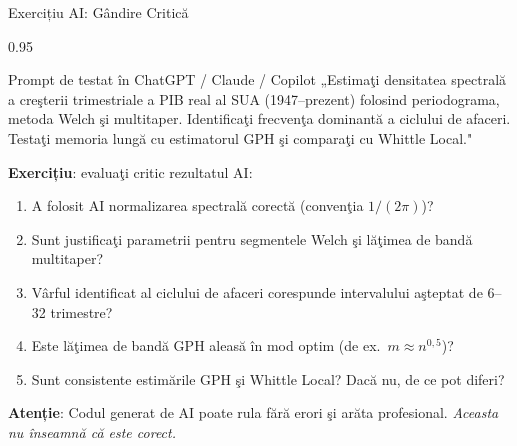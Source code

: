 \documentclass[9pt, aspectratio=169, t]{beamer}
\begin{document}
\begin{frame}{Exercițiu AI: Gândire Critică}
    \begin{cminipage}{0.95\textwidth}
    \vspace{-0.3cm}
    \begin{block}{\footnotesize Prompt de testat în ChatGPT / Claude / Copilot}
        {\footnotesize
        „Estimaţi densitatea spectrală a creşterii trimestriale a PIB real al SUA (1947--prezent) folosind periodograma, metoda Welch şi multitaper. Identificaţi frecvenţa dominantă a ciclului de afaceri. Testaţi memoria lungă cu estimatorul GPH şi comparaţi cu Whittle Local."
        }
    \end{block}
    \vspace{-2mm}
    {\footnotesize
    \textbf{Exercițiu}: evaluaţi critic rezultatul AI:
    \begin{enumerate}\setlength{\itemsep}{0pt}
        \item A folosit AI normalizarea spectrală corectă (convenţia $1/(2\pi)$)?
        \item Sunt justificaţi parametrii pentru segmentele Welch şi lăţimea de bandă multitaper?
        \item Vârful identificat al ciclului de afaceri corespunde intervalului aşteptat de 6--32 trimestre?
        \item Este lăţimea de bandă GPH aleasă în mod optim (de ex.\ $m \approx n^{0{,}5}$)?
        \item Sunt consistente estimările GPH şi Whittle Local? Dacă nu, de ce pot diferi?
    \end{enumerate}
    }
    \vspace{-2mm}
    \begin{alertblock}{}
        {\footnotesize \textbf{Atenție}: Codul generat de AI poate rula fără erori şi arăta profesional. \textit{Aceasta nu înseamnă că este corect.}}
    \end{alertblock}
    \end{cminipage}
\end{frame}

\end{document}
